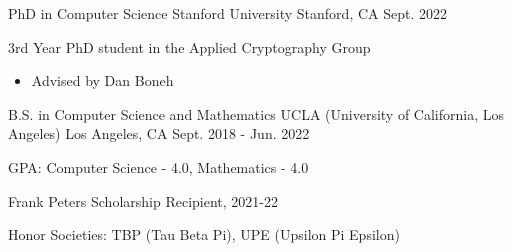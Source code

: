 

\begin{cventries}

\cventry
    {PhD in Computer Science} %
    {Stanford University} %
    {Stanford, CA} %
    {Sept. 2022} %
    {
      \begin{cvitems} %
        \item {3rd Year PhD student in the Applied Cryptography Group}
        \begin{itemize}
          \item{Advised by Dan Boneh}
        \end{itemize}
      \end{cvitems}
    }

  \cventry
    {B.S. in Computer Science and Mathematics} %
    {UCLA (University of California, Los Angeles)} %
    {Los Angeles, CA} %
    {Sept. 2018 - Jun. 2022} %
    {
      \begin{cvitems} %
        \item {GPA: Computer Science - 4.0, Mathematics - 4.0}
        \item {Frank Peters Scholarship Recipient, 2021-22}
        \item{Honor Societies: TBP (Tau Beta Pi), UPE (Upsilon Pi Epsilon)}
      \end{cvitems}
    }

\end{cventries}
